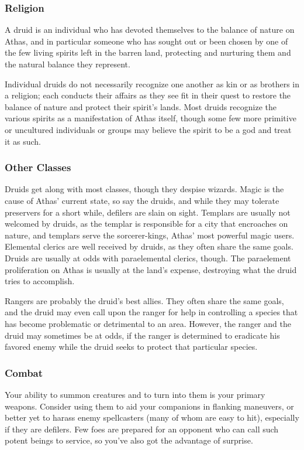 \subsubsection{Religion}
A druid is an individual who has devoted themselves to the balance of nature on Athas, and in particular someone who has sought out or been chosen by one of the few living spirits left in the barren land, protecting and nurturing them and the natural balance they represent.

Individual druids do not necessarily recognize one another as kin or as brothers in a religion; each conducts their affairs as they see fit in their quest to restore the balance of nature and protect their spirit's lands. Most druids recognize the various spirits as a manifestation of Athas itself, though some few more primitive or uncultured individuals or groups may believe the spirit to be a god and treat it as such.

\subsubsection{Other Classes}
Druids get along with most classes, though they despise wizards. Magic is the cause of Athas' current state, so say the druids, and while they may tolerate preservers for a short while, defilers are slain on sight. Templars are usually not welcomed by druids, as the templar is responsible for a city that encroaches on nature, and templars serve the sorcerer-kings, Athas' most powerful magic users. Elemental clerics are well received by druids, as they often share the same goals. Druids are usually at odds with paraelemental clerics, though. The paraelement proliferation on Athas is usually at the land's expense, destroying what the druid tries to accomplish.

Rangers are probably the druid's best allies. They often share the same goals, and the druid may even call upon the ranger for help in controlling a species that has become problematic or detrimental to an area. However, the ranger and the druid may sometimes be at odds, if the ranger is determined to eradicate his favored enemy while the druid seeks to protect that particular species.

\subsubsection{Combat}
Your ability to summon creatures and to turn into them is your primary weapons. Consider using them to aid your companions in flanking maneuvers, or better yet to harass enemy spellcasters (many of whom are easy to hit), especially if they are defilers. Few foes are prepared for an opponent who can call such potent beings to service, so you've also got the advantage of surprise.

